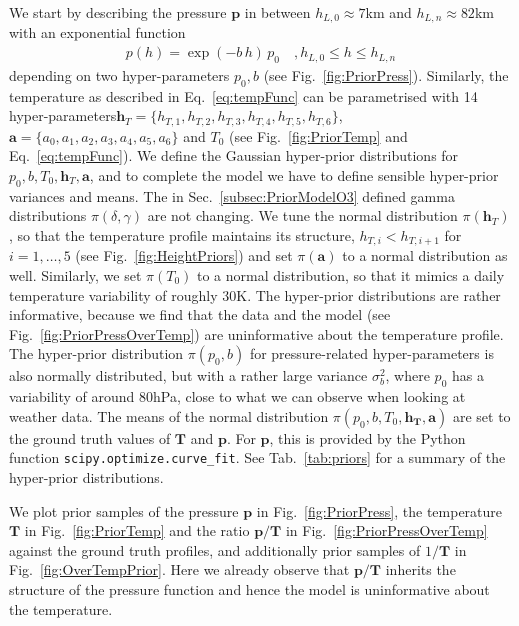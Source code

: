 We start by describing the pressure $\bm{p}$ in between $h_{L,0} \approx 7$km and $h_{L,n} \approx 82$km with an exponential function
\begin{align}
	p(h) =
	\exp \left( -b \, h \right)   \,  p_0 \quad , \text{$h_{L,0}  \leq h \leq h_{L,n}$}
	\label{eq:pressFunc}
\end{align}
depending on two hyper-parameters $p_0,b$ (see Fig.~\ref{fig:PriorPress}).
Similarly, the temperature as described in Eq.~\ref{eq:tempFunc} can be parametrised with 14 hyper-parameters\linebreak $\bm{h}_T = \{ h_{T,1}, h_{T,2},h_{T,3},h_{T,4},h_{T,5},h_{T,6} \}$, $\bm{a} = \{a_0, a_1, a_2,a_3,a_4,a_5,a_6 \} $ and $T_0$ (see Fig.~\ref{fig:PriorTemp} and Eq.~\ref{eq:tempFunc}).
We define the Gaussian hyper-prior distributions for $p_0,b, T_0,\bm{h}_T ,\bm{a} $, and to complete the model we have to define sensible hyper-prior variances and means.
The in Sec.~\ref{subsec:PriorModelO3} defined gamma distributions $\pi(\delta,\gamma)$ are not changing.
We tune the normal distribution $\pi(\bm{h}_T)$, so that the temperature profile maintains its structure, $ h_{T, i} < h_{T, i+1}$ for $i = 1,\dots, 5$ (see Fig.~\ref{fig:HeightPriors}) and set $\pi(\bm{a})$ to a normal distribution as well.
Similarly, we set $\pi(T_0)$ to a normal distribution, so that it mimics a daily temperature variability of roughly $30$K.
The hyper-prior distributions are rather informative, because we find that the data and the model (see Fig.~\ref{fig:PriorPressOverTemp}) are uninformative about the temperature profile.
The hyper-prior distribution $\pi(p_0, b)$ for pressure-related hyper-parameters is also normally distributed, but with a rather large variance $\sigma^2_b$, where $p_0$ has a variability of around $80$hPa, close to what we can observe when looking at weather data.
The means of the normal distribution $\pi(p_0,b,T_0,\bm{h_T},\bm{a})$ are set to the ground truth values of $\bm{T}$ and $\bm{p}$.
For $\bm{p}$, this is provided by the Python function \texttt{scipy.optimize.curve\_fit}.
See Tab.~\ref{tab:priors} for a summary of the hyper-prior distributions.

We plot prior samples of the pressure $\bm{p}$ in Fig.~\ref{fig:PriorPress}, the temperature $\bm{T}$ in Fig.~\ref{fig:PriorTemp} and the ratio $\bm{p}/\bm{T}$ in Fig.~\ref{fig:PriorPressOverTemp} against the ground truth profiles, and additionally prior samples of $1/\bm{T}$ in Fig.~\ref{fig:OverTempPrior}.
Here we already observe that $\bm{p}/\bm{T}$ inherits the structure of the pressure function and hence the model is uninformative about the temperature.
\clearpage




